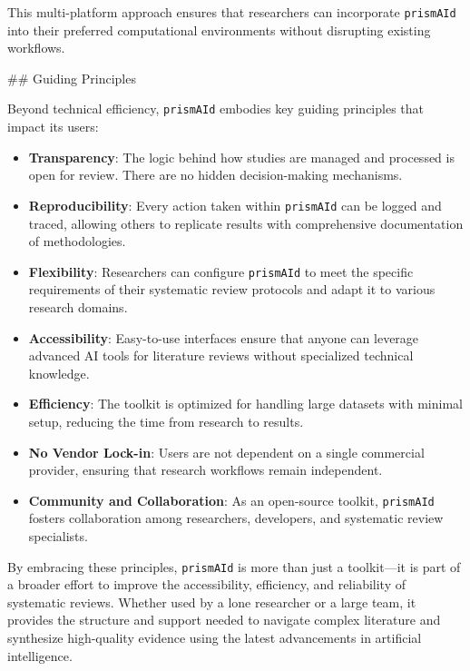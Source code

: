 This multi-platform approach ensures that researchers can incorporate \texttt{prismAId} into their preferred computational environments without disrupting existing workflows.

## Guiding Principles

Beyond technical efficiency, \texttt{prismAId} embodies key guiding principles that impact its users:

\begin{itemize}
    \item \textbf{Transparency}: The logic behind how studies are managed and processed is open for review. There are no hidden decision-making mechanisms.

    \item \textbf{Reproducibility}: Every action taken within \texttt{prismAId} can be logged and traced, allowing others to replicate results with comprehensive documentation of methodologies.

    \item \textbf{Flexibility}: Researchers can configure \texttt{prismAId} to meet the specific requirements of their systematic review protocols and adapt it to various research domains.

    \item \textbf{Accessibility}: Easy-to-use interfaces ensure that anyone can leverage advanced AI tools for literature reviews without specialized technical knowledge.

    \item \textbf{Efficiency}: The toolkit is optimized for handling large datasets with minimal setup, reducing the time from research to results.

    \item \textbf{No Vendor Lock-in}: Users are not dependent on a single commercial provider, ensuring that research workflows remain independent.

    \item \textbf{Community and Collaboration}: As an open-source toolkit, \texttt{prismAId} fosters collaboration among researchers, developers, and systematic review specialists.
\end{itemize}

By embracing these principles, \texttt{prismAId} is more than just a toolkit—it is part of a broader effort to improve the accessibility, efficiency, and reliability of systematic reviews. Whether used by a lone researcher or a large team, it provides the structure and support needed to navigate complex literature and synthesize high-quality evidence using the latest advancements in artificial intelligence.


